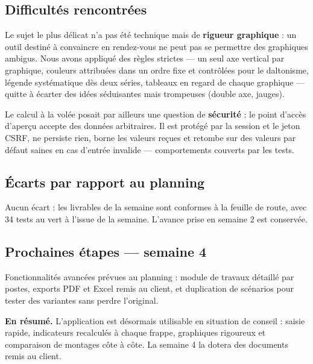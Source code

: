 \documentclass[11pt,a4paper]{article}
\begin{document}

\subsection{Difficultés rencontrées}
Le sujet le plus délicat n'a pas été technique mais de \textbf{rigueur graphique} : un outil destiné à convaincre en rendez-vous ne peut pas se permettre des graphiques ambigus. Nous avons appliqué des règles strictes — un seul axe vertical par graphique, couleurs attribuées dans un ordre fixe et contrôlées pour le daltonisme, légende systématique dès deux séries, tableaux en regard de chaque graphique — quitte à écarter des idées séduisantes mais trompeuses (double axe, jauges).

Le calcul à la volée posait par ailleurs une question de \textbf{sécurité} : le point d'accès d'aperçu accepte des données arbitraires. Il est protégé par la session et le jeton CSRF, ne persiste rien, borne les valeurs reçues et retombe sur des valeurs par défaut saines en cas d'entrée invalide — comportements couverts par les tests.

\subsection{Écarts par rapport au planning}
Aucun écart : les livrables de la semaine sont conformes à la feuille de route, avec 34 tests au vert à l'issue de la semaine. L'avance prise en semaine 2 est conservée.

\subsection{Prochaines étapes --- semaine 4}
Fonctionnalités avancées prévues au planning : module de travaux détaillé par postes, exports PDF et Excel remis au client, et duplication de scénarios pour tester des variantes sans perdre l'original.

\vspace{0.6cm}
\begin{tcolorbox}[colback=eccblue!5,colframe=eccblue!60,boxrule=0.6pt,arc=2pt,
	left=8pt,right=8pt,top=6pt,bottom=6pt]
	\small
	\textbf{\color{eccblue}En résumé.} L'application est désormais utilisable en situation de conseil : saisie rapide, indicateurs recalculés à chaque frappe, graphiques rigoureux et comparaison de montages côte à côte. La semaine 4 la dotera des documents remis au client.
\end{tcolorbox}
\end{document}
